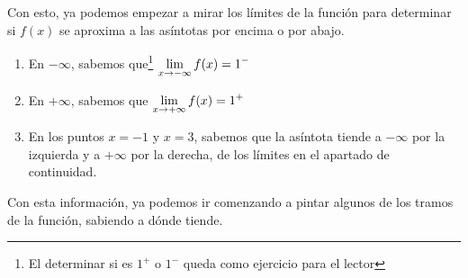 \documentclass[sans]{apuntes}
\begin{document}
\begin{examplebox}
	\begin{center}
	\end{center}

	Con esto, ya podemos empezar a mirar los límites de la función para determinar si $f(x)$ se aproxima a las asíntotas por encima o por abajo.
	\begin{enumerate}
		\item En $-\infty$, sabemos que\footnote{El determinar si es $1^+$ o $1^-$ queda como ejercicio para el lector} $\displaystyle\lim_{x \to -\infty}f(x) = 1^-$
		\item  En $+\infty$, sabemos que $\displaystyle\lim_{x \to +\infty}f(x) = 1^+$
		\item En los puntos $x = -1$ y $x = 3$, sabemos que la asíntota tiende a $-\infty$ por la izquierda y a $+\infty$ por la derecha, de los límites en el apartado de continuidad.
	\end{enumerate}

	Con esta información, ya podemos ir comenzando a pintar algunos de los tramos de la función, sabiendo a dónde tiende.


\end{examplebox}
\end{document}
